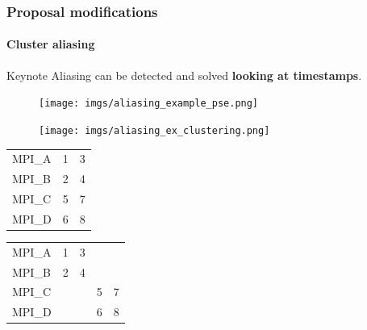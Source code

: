\documentclass{beamer}
\begin{document}
\begin{frame}
	\frametitle{Proposal modifications}
	\framesubtitle{Cluster aliasing}
	\begin{block}{Keynote}
		Aliasing can be detected and solved \textbf{looking at timestamps}.
	\end{block}
	\begin{multicols}{2}
	\begin{figure}
		\texttt{[image: imgs/aliasing\_example\_pse.png]}
	\end{figure}
	\columnbreak
	\begin{figure}
		\texttt{[image: imgs/aliasing\_ex\_clustering.png]}
	\end{figure}
	\end{multicols}
	\pause
	\begin{multicols}{2}
		\null \vfill
		\begin{table}[]
			\centering
			\begin{tabular}{l|ll}
				MPI\_A & 1 & 3 \\
				MPI\_B & 2 & 4 \\
				MPI\_C & 5 & 7 \\
				MPI\_D & 6 & 8
			\end{tabular}
		\end{table}
		\vfill \null
		\columnbreak
		\pause
		\null \vfill
		\begin{table}[]
			\centering
			\begin{tabular}{l|llll}
				MPI\_A & 1 & 3 &   &   \\
				MPI\_B & 2 & 4 &   &   \\ \hline
				MPI\_C &   &   & 5 & 7 \\
				MPI\_D &   &   & 6 & 8
			\end{tabular}
		\end{table}
		\vfill \null
	\end{multicols}
\end{frame}
\end{document}

